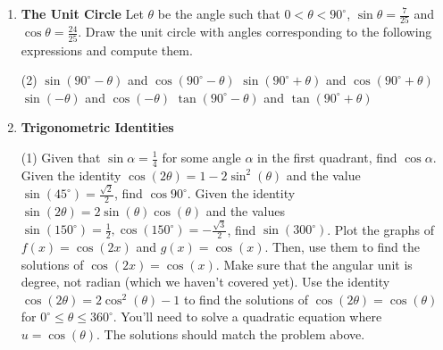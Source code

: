 \begin{enumerate}
\begin{tasks}[after-item-skip = 30pt, after-skip = 30pt]
\task 


\task 

\end{tasks}


\item \textbf{The Unit Circle} Let $\theta$ be the angle such that $0 < \theta < 90^{\circ}$, $\sin \theta = \frac{7}{25}$ and $\cos \theta = \frac{24}{25}$. Draw the unit circle with angles corresponding to the following expressions and compute them.
\begin{tasks}[after-item-skip = 80pt, after-skip = 80pt](2)
\task $\sin(90^{\circ} - \theta)$ and $\cos(90^{\circ}-\theta)$
\task $\sin (90^{\circ} + \theta)$ and $\cos (90^{\circ} + \theta)$
\task $\sin (- \theta)$ and $\cos (- \theta)$
\task $\tan (90^{\circ} - \theta)$ and $\tan (90^{\circ} + \theta)$
\end{tasks}

\newpage

\item \textbf{Trigonometric Identities} 

\begin{tasks}[after-item-skip = 55pt, after-skip = 55pt](1)
\task Given that $\sin \alpha = \frac{1}{4}$ for some angle $\alpha$ in the first quadrant, find $\cos \alpha$.
\task Given the identity $\cos (2\theta) = 1-2\sin^2 (\theta)$ and the value $\sin (45^\circ) = \frac{\sqrt{2}}{2}$, find $\cos 90^{\circ}$.
\task Given the identity $\sin (2\theta) = 2\sin (\theta) \cos (\theta)$ and the values $\sin (150^\circ) = \frac{1}{2}, \cos(150^\circ) = -\frac{\sqrt{3}}{2}$, find $\sin (300^{\circ})$.
\task Plot the graphs of $f(x) = \cos(2x)$ and $g(x) = \cos(x)$. Then, use them to find the solutions of $\cos(2x) = \cos(x)$. Make sure that the angular unit is degree, not radian (which we haven't covered yet).
\task Use the identity $\cos (2\theta) = 2\cos^2 (\theta)-1$ to find the solutions of $\cos (2\theta) = \cos(\theta)$ for $0^{\circ} \leq \theta \leq 360^{\circ}$. You'll need to solve a quadratic equation where $u=\cos(\theta)$. The solutions should match the problem above.
\end{tasks}
\end{enumerate}